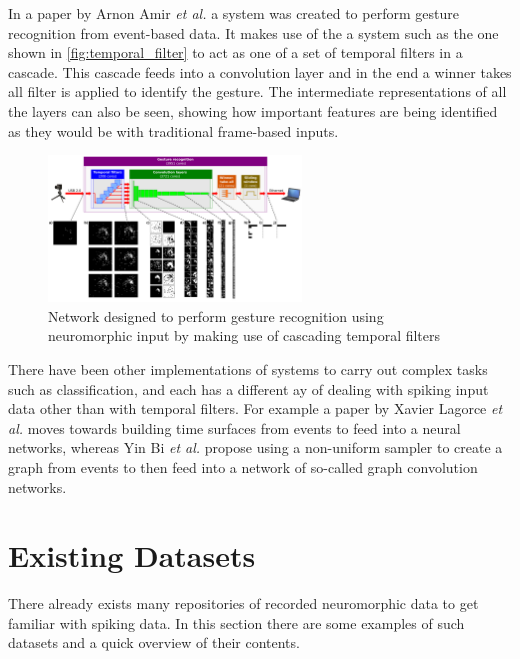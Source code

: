 In a paper by Arnon Amir \textit{et al.}\cite{eventBasedGestureRec} a system was created to perform gesture recognition from event-based data. It makes use of the a system such as the one shown in \autoref{fig:temporal_filter} to act as one of a set of temporal filters in a cascade. This cascade feeds into a convolution layer and in the end a winner takes all filter is applied to identify the gesture. The intermediate representations of all the layers can also be seen, showing how important features are being identified as they would be with traditional frame-based inputs.

\begin{figure}[htb]
      \centering
      \includegraphics[width=0.6\textwidth]{background/images/event_to_gesture_rec_network.png}
      \caption{Network designed to perform gesture recognition using neuromorphic input by making use of cascading temporal filters\cite{eventBasedGestureRec}}
      \label{fig:event_to_gesture_rec_network}
\end{figure}

There have been other implementations of systems to carry out complex tasks such as classification, and each has a different ay of dealing with spiking input data other than with temporal filters. For example a paper by Xavier Lagorce \textit{et al.}\cite{eventsToTimeSurfaces} moves towards building time surfaces from events to feed into a neural networks, whereas Yin Bi \textit{et al.}\cite{eventsToGraphs} propose using a non-uniform sampler to create a graph from events to then feed into a network of so-called graph convolution networks.

\section{Existing Datasets}

There already exists many repositories of recorded neuromorphic data to get familiar with spiking data. In this section there are some examples of such datasets and a quick overview of their contents.

